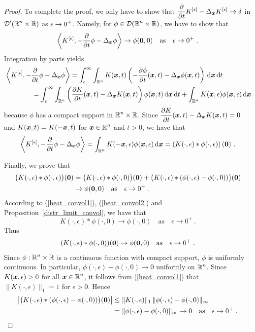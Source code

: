 \begin{proof}
To complete the proof, we only have to show that
$\DS \pdfdx{K^{[\epsilon]}}{t} - \Delta_{\VEC{x}} K^{[\epsilon]}
\rightarrow \delta$ in $\DS \DD'(\RR^n\times \RR)$ as
$\DS \epsilon \to 0^+$.
Namely, for $\DS \phi \in \DD(\RR^n\times \RR)$,
we have to show that
\[
\ps{K^{[\epsilon]}}{-\pdfdx{\phi}{t} - \Delta_{\VEC{x}} \phi}
\rightarrow \phi(\VEC{0},0) \quad \text{as} \quad \epsilon \to 0^+ \ .
\]
Integration by parts yields
\begin{align*}
&\ps{K^{[\epsilon]}}{-\pdfdx{\phi}{t} - \Delta_{\VEC{x}} \phi}
= \int_{\epsilon}^\infty \int_{\RR^n} K(\VEC{x},t) \left(
-\pdydx{\phi}{t}(\VEC{x},t) - \Delta_{\VEC{x}} \phi(\VEC{x},t)\right)
\dx{\VEC{x}} \dx{t} \\
&\qquad\qquad
= \int_{\epsilon}^\infty \int_{\RR^n} \left( \pdydx{K}{t}(\VEC{x},t) 
-\Delta_{\VEC{x}} K(\VEC{x},t)\right) \phi(\VEC{x},t) \dx{\VEC{x}} \dx{t}
+ \int_{\RR^n} K(\VEC{x},\epsilon) \phi(\VEC{x},\epsilon) \dx{\VEC{x}}
\end{align*}
because $\phi$ has a compact support in $\DS \RR^n\times \RR$.  Since
$\DS \pdydx{K}{t}(\VEC{x},t) -\Delta_{\VEC{x}} K(\VEC{x},t) = 0$
and $K(\VEC{x},t) = K(-\VEC{x},t)$ for
$\DS \VEC{x}\in \RR^n$ and $t>0$, we have
that
\[
\ps{K^{[\epsilon]}}{-\pdfdx{\phi}{t} - \Delta_{\VEC{x}} \phi}
= \int_{\RR^n} K(-\VEC{x},\epsilon) \phi(\VEC{x},\epsilon)
\dx{\VEC{x}}
= \left( K(\cdot,\epsilon) \ast \phi(\cdot, \epsilon)\right)(\VEC{0}) \ .
\]

Finally, we prove that
\begin{align*}
\big( K(\cdot,\epsilon) \ast \phi(\cdot, \epsilon)\big)(\VEC{0})
&= \big( K(\cdot,\epsilon) \ast \phi(\cdot, 0)\big)(\VEC{0}) +
\big( K(\cdot,\epsilon) \ast ( \phi(\cdot, \epsilon) -
\phi(\cdot, 0) ) \big)(\VEC{0}) \\
& \rightarrow \phi(\VEC{0},0) \quad \text{as} \quad \epsilon \to 0^+ \ .
\end{align*}
According to (\ref{heat_convol1}), (\ref{heat_convol2}) and
Proposition~\ref{distr_limit_convol}, we have that
\[
K(\cdot,\epsilon) \ast \phi(\cdot, 0) \rightarrow \phi(\cdot, 0)
\quad \text{as} \quad \epsilon \to 0^+ \ .
\]
Thus
\[
(K(\cdot,\epsilon) \ast \phi(\cdot, 0))(\VEC{0}) \rightarrow \phi(\VEC{0},0)
\quad \text{as} \quad \epsilon \to 0^+ \  .
\]
Since $\DS \phi:\RR^n\times \RR$ is a continuous function with
compact support, $\phi$ is uniformly continuous.  In particular,
$\phi(\cdot, \epsilon) - \phi(\cdot, 0) \rightarrow 0$ 
uniformly on $\DS \RR^n$.  Since $K(\VEC{x},\epsilon) >0$ for all
$\DS \VEC{x}\in \RR^n$, it follows from (\ref{heat_convol1}) that
$\|K(\cdot,\epsilon)\|_1 = 1$ for $\epsilon >0$.  Hence
\begin{align*}
\left| \big( K(\cdot,\epsilon) \ast ( \phi(\cdot, \epsilon) -
\phi(\cdot, 0) )\big)(\VEC{0})  \right| &\leq
\| K(\cdot, \epsilon) \|_1 \,
\|\phi(\cdot, \epsilon) - \phi(\cdot, 0)\|_\infty \\
&= \|\phi(\cdot, \epsilon) - \phi(\cdot, 0)\|_\infty
\rightarrow 0 \quad \text{as} \quad \epsilon \to 0^+ \ . \qedhere
\end{align*}
\end{proof}

